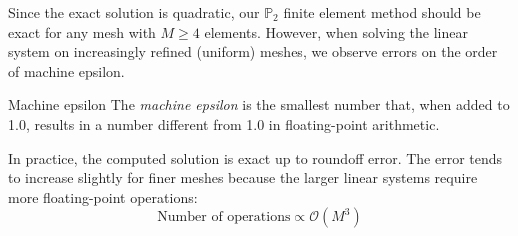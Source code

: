 \documentclass[a4paper,10pt]{article}
\begin{document}
Since the exact solution is quadratic, our $\mathbb{P}_2$ finite element method should be exact for any mesh with $M \geq 4$ elements. 
However, when solving the linear system on increasingly refined (uniform) meshes, we observe errors on the order of machine epsilon.
\begin{remark}{Machine epsilon}{}
	The \emph{machine epsilon} is the smallest number that, when added to 1.0, results in a number different from 1.0 in floating-point arithmetic.
\end{remark}

In practice, the computed solution is exact up to roundoff error. The error tends to increase slightly for finer meshes because the larger linear systems require more floating-point operations:
\[
	\text{Number of operations} \propto \mathcal{O}(M^3)
\]
\end{document}
